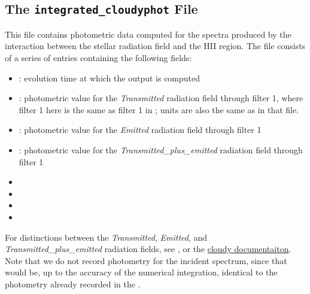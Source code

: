 \documentclass[letterpaper,10pt,english]{sphinxmanual}
\begin{document}
\subsection{The \texttt{integrated\_cloudyphot} File}
\label{cloudy:the-integrated-cloudyphot-file}
This file contains photometric data computed for the spectra produced
by the interaction between the stellar radiation field and the HII
region. The file consists of a series of entries containing the
following fields:
\begin{itemize}
\item {} 
: evolution time at which the output is computed

\item {} 
: photometric value for the \emph{Transmitted}
radiation field through filter 1, where filter 1 here is the same as
filter 1 in {\hyperref[output:ssec-int-phot-file]{\emph{}}}; units are also the same as
in that file.

\item {} 
: photometric value for the \emph{Emitted}
radiation field through filter 1

\item {} 
: photometric value for the
\emph{Transmitted\_plus\_emitted} radiation field through filter 1

\item {} 

\item {} 

\item {} 

\item {} 

\end{itemize}

For distinctions between the \emph{Transmitted}, \emph{Emitted}, and
\emph{Transmitted\_plus\_emitted} radiation fields, see
{\hyperref[cloudy:sssec-int-cloudyspec-file]{\emph{}}}, or the \href{http://nublado.org}{cloudy documentaiton}. Note that we do not record photometry for the
incident spectrum, since that would be, up to the accuracy of the
numerical integration, identical to the photometry already recorded in
the {\hyperref[output:ssec-int-phot-file]{\emph{}}}.
\end{document}
